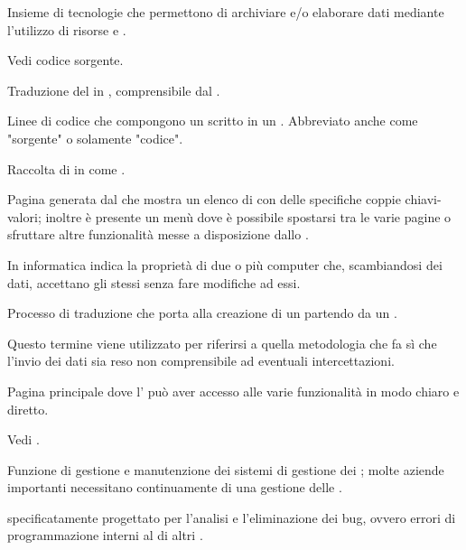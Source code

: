 {Insieme di tecnologie che permettono di archiviare e/o elaborare dati mediante l'utilizzo di risorse  e  .}

{Vedi codice sorgente.}

{Traduzione del  in , comprensibile dal .}

{Linee di codice che compongono un  scritto in un . Abbreviato anche come "sorgente" o solamente "codice".}

{Raccolta di  in  come .}

{Pagina generata dal   che mostra un elenco di  con delle specifiche coppie chiavi-valori; inoltre è presente un menù dove è possibile spostarsi tra le varie pagine  o sfruttare altre funzionalità messe a disposizione dallo .}

{In informatica indica la proprietà di due o più computer che, scambiandosi dei dati, accettano gli stessi  senza fare modifiche ad essi.}

{Processo di traduzione che porta alla creazione di un  partendo da un .}

{Questo termine viene utilizzato per riferirsi a quella metodologia che fa sì che l'invio dei dati sia reso non comprensibile ad eventuali intercettazioni.}




{Pagina principale dove l' può aver accesso alle varie funzionalità in modo chiaro e diretto.}

{Vedi .}

{Funzione di gestione e manutenzione dei sistemi di gestione dei ; molte aziende importanti necessitano continuamente di una gestione delle .}

{ specificatamente progettato per l'analisi e l'eliminazione dei bug, ovvero errori di programmazione interni al  di altri .}

